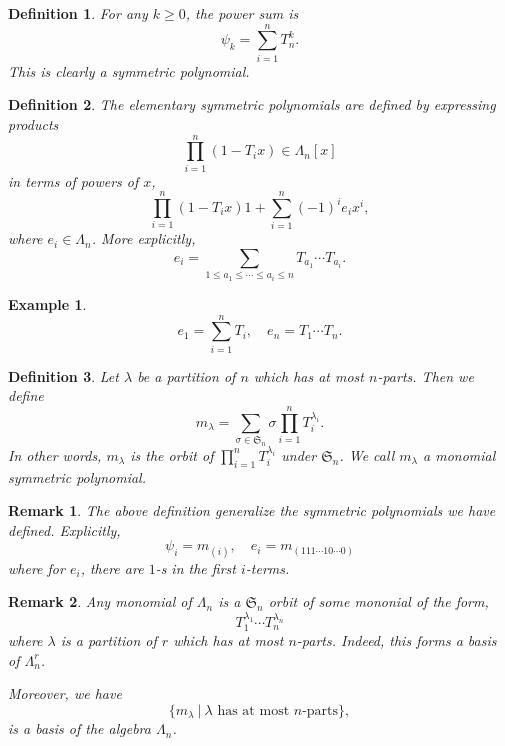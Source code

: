 \documentclass[10pt]{article}
\newtheorem{definition}{Definition}[section]
\newtheorem{remark}{Remark}[section]
\newtheorem{example}{Example}[section]
\numberwithin{equation}{theorem}
\newcommand{\sep}[0]{\:|\:}
\begin{document}
\begin{definition}
  For any $k\geq 0$, the power sum is 
  \begin{equation*}
    \psi_k = \sum_{i=1}^n T_n^k.
  \end{equation*}
  This is clearly a symmetric polynomial.
\end{definition}
\begin{definition}
  The elementary symmetric polynomials are defined by expressing products 
  \begin{equation*}
    \prod_{i=1}^n(1-T_i x)\in\Lambda_n[x]
  \end{equation*}
  in terms of powers of $x$,
  \begin{equation*}
    \prod_{i=1}^n(1-T_i x) 1+ \sum_{i=1}^n(-1)^ie_ix^i,
  \end{equation*}
  where $e_i\in\Lambda_n$. More explicitly,
  \begin{equation*}
    e_i = \sum_{1\leq a_1\leq \cdots\leq a_i\leq n}T_{a_1}\cdots T_{a_i}.
  \end{equation*}
\end{definition}
\begin{example}
  \begin{equation*}
    e_1 = \sum_{i=1}^n T_i,\quad e_n = T_1\cdots T_n.
  \end{equation*}
\end{example}
\begin{definition}
  Let $\lambda$ be a partition of $n$ which has at most $n$-parts. Then we define 
  \begin{equation*}
    m_\lambda = \sum_{\sigma\in\mathfrak{S}_n}\sigma \prod_{i=1}^n T_i^{\lambda_i}.
  \end{equation*}
  In other words, $m_\lambda$ is the orbit of $\prod_{i=1}^n T_i^{\lambda_i}$ under $\mathfrak{S}_n$.
  We call $m_\lambda$ a monomial symmetric polynomial.
\end{definition}
\begin{remark}
  The above definition generalize the symmetric polynomials we have defined. Explicitly,
  \begin{equation*}
    \psi_i = m_{(i)},\quad e_i = m_(111\cdots 10\cdots0)
  \end{equation*}
  where for $e_i$, there are $1$-s in the first $i$-terms.
\end{remark}
\begin{remark}
  \label{remark_symmetric_polynomials_basis}
  Any monomial of $\Lambda_n$ is a $\mathfrak{S}_n$ orbit of some mononial of the form,
  \begin{equation*}
    T_1^{\lambda_1}\cdots T_n^{\lambda_n}
  \end{equation*}
  where $\lambda$ is a partition of $r$ which has at most $n$-parts. Indeed, this forms a basis of $\Lambda_n^r$. 
  \par Moreover, we have 
  \begin{equation*}
    \{m_\lambda\sep\text{$\lambda$ has at most $n$-parts}\},
  \end{equation*}
  is a basis of the algebra $\Lambda_n$.
\end{remark}
\end{document}
